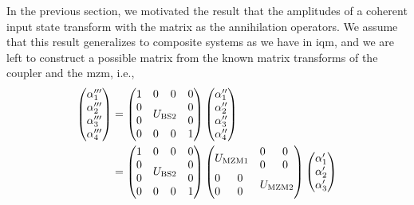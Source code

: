 In the previous section, we motivated the result that the amplitudes of a coherent input state transform with the matrix as the annihilation operators.
We assume that this result generalizes to composite systems as we have in \gls{iqm}, and we are left to construct a possible matrix from the known matrix transforms of the coupler and the \gls{mzm}, i.e.,
\begin{equation}
	\begin{split}
		\begin{pmatrix}
			\alpha_1^{\prime\prime\prime} \\
			\alpha_2^{\prime\prime\prime} \\
			\alpha_3^{\prime\prime\prime} \\
			\alpha_4^{\prime\prime\prime}
		\end{pmatrix}
		&=
		\begin{pmatrix}
			 1 & 0 & 0 & 0 \\
			 0 & \multicolumn{2}{c}{\multirow{2}{*}{$U_\text{BS2}$}} & 0 \\
			 0 & & & 0 \\
			 0 & 0 & 0 & 1
		\end{pmatrix}
		\begin{pmatrix}
			\alpha_1^{\prime\prime} \\
			\alpha_2^{\prime\prime} \\
			\alpha_3^{\prime\prime} \\
			\alpha_4^{\prime\prime}
		\end{pmatrix}
		\\
		&=
		\begin{pmatrix}
			 1 & 0 & 0 & 0 \\
			 0 & \multicolumn{2}{c}{\multirow{2}{*}{$U_\text{BS2}$}} & 0 \\
			 0 & & & 0 \\
			 0 & 0 & 0 & 1
		\end{pmatrix}
		\begin{pmatrix}
			 \multicolumn{2}{c}{\multirow{2}{*}{$U_\text{MZM1}$}} & 0 & 0 \\
			 & & 0 & 0 \\
			 0 & 0 & \multicolumn{2}{c}{\multirow{2}{*}{$U_\text{MZM2}$}} \\
			 0 & 0 & & \\
		\end{pmatrix}
		\begin{pmatrix}
			\alpha_1^\prime \\
			\alpha_2^\prime \\
			\alpha_3^\prime \\

\end{pmatrix}
\end{split}
\end{equation}
